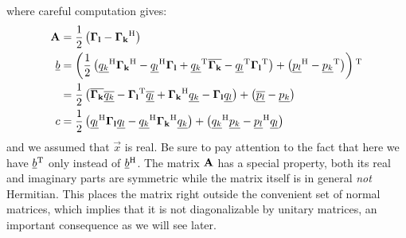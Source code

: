 \documentclass[a4paper,10pt]{article}
\begin{document}
where careful computation gives:
\begin{equation} \label{eq:combined_oscillators}
\begin{split}
  \mathbf{A} & = \frac{1}{2} \left(\mathbf{\Gamma_l} - \mathbf{\Gamma_k}{}^{\textnormal{H}} \right) \\
  \underline{b} & = \left(\frac{1}{2} \left(
                                  \underline{q_k}{}^{\textnormal{H}} \mathbf{\Gamma_k}{}^{\textnormal{H}}
                                 -\underline{q_l}{}^{\textnormal{H}} \mathbf{\Gamma_l}
                                 +\underline{q_k}{}^{\textnormal{T}} \overline{\mathbf{\Gamma_k}}
                                 -\underline{q_l}{}^{\textnormal{T}} \mathbf{\Gamma_l}{}^{\textnormal{T}}
                                \right)
                + \left(\underline{p_l}{}^{\textnormal{H}} - \underline{p_k}{}^{\textnormal{T}}\right)
              \right){}^{\textnormal{T}} \\
          & = \frac{1}{2} \left(
                            \overline{\mathbf{\Gamma_k}} \overline{\underline{q_k}}
                           -\mathbf{\Gamma_l}{}^{\textnormal{T}} \overline{\underline{q_l}}
                           +\mathbf{\Gamma_k}{}^{\textnormal{H}} \underline{q_k}
                           -\mathbf{\Gamma_l} \underline{q_l}
                          \right)
              + \left(\overline{\underline{p_l}} - \underline{p_k}\right) \\
  c & = \frac{1}{2} \left(
                      \underline{q_l}{}^{\textnormal{H}} \mathbf{\Gamma_l} \underline{q_l}
                     -\underline{q_k}{}^{\textnormal{H}} \mathbf{\Gamma_k}{}^{\textnormal{H}} \underline{q_k}
                    \right)
        + \left(\underline{q_k}{}^{\textnormal{H}} \underline{p_k} - \underline{p_l}{}^{\textnormal{H}} \underline{q_l}\right)
\end{split}
\end{equation}
and we assumed that $\vec{x}$ is real. Be sure to pay attention to
the fact that here we have $\underline{b}{}^{\textnormal{T}}$ only instead of $\underline{b}{}^{\textnormal{H}}$.
The matrix $\mathbf{A}$ has a special property, both its real and
imaginary parts are symmetric while the matrix itself is in general
\emph{not} Hermitian. This places the matrix right outside the convenient
set of normal matrices, which implies that it is not diagonalizable
by unitary matrices,  an important  consequence as we will see later.
\end{document}
